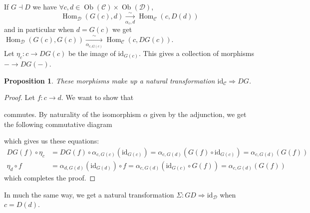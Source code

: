 \documentclass{article}
\newcommand{\id}{\mathrm{id}}
\newcommand{\cat}{\mathcal{C}}
\newcommand{\catt}{\mathcal{D}}
\DeclareMathOperator{\Ob}{Ob}
\DeclareMathOperator{\Hom}{Hom}
\theoremstyle{plain}
\newtheorem{proposition}[theorem]{Proposition}
\theoremstyle{definition}
\theoremstyle{remark}
\begin{document}
If $G \dashv D$ we have $\forall c,d \in \Ob(\cat)\times \Ob(\catt)$,
\[\Hom_\catt (G(c),d) \xrightarrow[\alpha_c,d]{\sim} \Hom_\cat (c,D(d))\]
and in particular when $d=G(c)$ we get $\Hom_\catt (G(c),G(c)) \xrightarrow[\alpha_{c,G(c)}]{\sim} \Hom_\cat (c,DG(c))$. \\
Let $\eta_c : c \to DG(c)$ be the image of $\id_{G(c)}$. This gives a collection of morphisms $- \to DG(-)$.
\begin{proposition}
    These morphisms make up a natural transformation $\id_\cat \Rightarrow DG$.
\end{proposition}
\begin{proof}
    Let $f : c\to d$. We want to show that
    \begin{center}
    \end{center}
    commutes. By naturality of the isomorphism $\alpha$ given by the adjunction, we get the following commutative diagram
    \begin{center}
    \end{center}
    which gives us these equations:
    \begin{align*}
        DG(f) \circ \eta_c & = DG(f) \circ \alpha_{c,G(c)}(\id_{G(c)}) = \alpha_{c,G(d)}(G(f)\circ \id_{G(c)}) = \alpha_{c,G(d)} (G(f)) \\
        \eta_d \circ f & = \alpha_{d,G(d)}(\id_{G(d)}) \circ f = \alpha_{c,G(d)}(\id_{G(c)} \circ G(f)) = \alpha_{c,G(d)} (G(f))
    \end{align*}
    which completes the proof.
\end{proof}

In much the same way, we get a natural transformation $\Sigma : GD \Rightarrow \id_\catt$ when $c=D(d)$.
\end{document}
